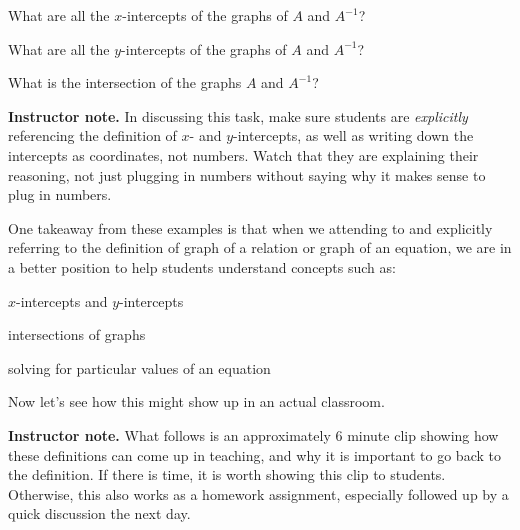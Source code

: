 \documentclass[11pt]{article}
\newcommand\smallnote[1]
	{\begin{mdframed}\raggedright  {\bf Instructor note.} {#1} \end{mdframed}}
\newenvironment{task}
	{\begin{mdframed}[linecolor=lightgray, linewidth=3pt]\raggedright}
	{\end{mdframed}}
\theoremstyle{definition}
\begin{document}
\begin{task}
What are all the $x$-intercepts of the graphs of $A$ and $A^{-1}$?

What are all the $y$-intercepts of the graphs of $A$ and $A^{-1}$?

What is the intersection of the graphs $A$ and $A^{-1}$?
\end{task}

\smallnote{In discussing this task, make sure students are {\it explicitly} referencing the definition of $x$- and $y$-intercepts, as well as writing down the intercepts as coordinates, not numbers. Watch that they are explaining their reasoning, not just plugging in numbers without saying why it makes sense to plug in numbers.}

One takeaway from these examples is that when we attending to and explicitly referring to the definition of graph of a relation or graph of an equation, we are in a better position to help students understand concepts such as:
	\begin{itemize*}
	\item $x$-intercepts and $y$-intercepts
	\item intersections of graphs
	\item solving for particular values of an equation
	\end{itemize*}

Now let's see how this might show up in an actual classroom.  

\smallnote{What follows is an approximately 6 minute clip showing how these definitions can come up in teaching, and why it is important to go back to the definition. If there is time, it is worth showing this clip to students. Otherwise, this also works as a homework assignment, especially followed up by a quick discussion the next day.}
\end{document}
